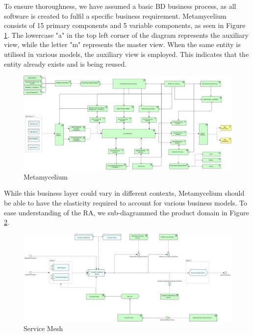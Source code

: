 \documentclass[preprint,12pt]{elsarticle}
\begin{document}
To ensure thoroughness, we have assumed a basic BD business process, as all software is created to fulfil a specific business requirement. Metamycelium consists of 15 primary components and 5 variable components, as seen in Figure \ref{fig:Metamycelium}. The lowercase "a" in the top left corner of the diagram represents the auxiliary view, while the letter "m" represents the master view. When the same entity is utilised in various models, the auxiliary view is employed. This indicates that the entity already exists and is being reused. 


\begin{figure}
  \includegraphics[width=23cm]{images/Metamycelium.jpg}
  \caption{Metamycelium}
  \label{fig:Metamycelium}
\end{figure}

While this business layer could vary in different contexts, Metamycelium should be able to have the elasticity required to account for various business models. To ease understanding of the RA, we sub-diagrammed the product domain in Figure \ref{fig:MetamyceliumServiceMesh}.

\begin{figure}
  \includegraphics[width=23cm]{images/metamyceliumServiceMesh.jpg}
  \caption{Service Mesh}
  \label{fig:MetamyceliumServiceMesh}
\end{figure}
\end{document}
